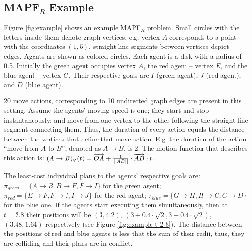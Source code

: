 \documentclass[review]{elsarticle}
\newcommand\konstantin[1]{\nb{\textbf{Konstantin:}}{red}{#1}}
\newcommand\roni[1]{\nb{\textbf{Roni:}}{green}{#1}}
\newcommand{\mapfr}{\ac{MAPF}$_R$\xspace}
\begin{document}
\subsection{\mapfr Example}
Figure \ref{fig:example} shows an example \mapfr problem. 
Small circles with the letters inside them denote graph vertices, e.g. vertex $A$ corresponds to a point with the coordinates $(1, 5)$, straight line segments between vertices depict edges. %
Agents are shown as colored circles. Each agent is a disk with a radius of 0.5. Initially the green agent occupies vertex $A$, the red agent -- vertex $E$, and the blue agent -- vertex $G$. Their respective goals are $I$ (green agent), $J$ (red agent), and $D$ (blue agent).

20 move actions, corresponding to 10 undirected graph edges are present in this setting. Assume the agents' moving speed is one; they start and stop instantaneously; and move from one vertex to the other following the straight line segment connecting them. Thus, the duration of every action equals the distance between the vertices that define that move action. E.g. the duration of the action ``move from $A$ to $B$'', denoted as $A \rightarrow B$, is 2. The motion function that describes this action is: $(A \rightarrow B)_\varphi(t) = \overrightarrow{OA} + {1\over{||AB||}} \cdot \overrightarrow{AB} \cdot t$.

The least-cost individual plans to the agents' respective goals are: $\pi_{green}=\{A \rightarrow B, B \rightarrow F, F \rightarrow I\}$ for the green agent; $\pi_{red}=\{E \rightarrow F, F \rightarrow I, I \rightarrow J\}$ for the red agent; $\pi_{blue}=\{G \rightarrow H, H \rightarrow C, C \rightarrow D\}$ for the blue one. If the agents start executing them simultaneously, then at $t=2.8$ their positions will be $(3, 4.2)$, $(3+0.4\cdot \sqrt{2}, 3-0.4\cdot \sqrt{2})$, $(3.48, 1.64)$  respectively (see Figure \ref{fig:example-t-2-8}). The distance between the positions of red and blue agents is less that the sum of their radii, thus, they are colliding and their plans are in conflict. 

\end{document}
